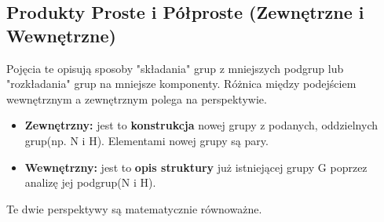 \subsection{Produkty Proste i Półproste (Zewnętrzne i Wewnętrzne)} 
\begin{remark}

	Pojęcia te opisują sposoby "składania" grup z mniejszych podgrup lub "rozkładania" grup na mniejsze komponenty. Różnica między podejściem wewnętrznym a zewnętrznym polega na perspektywie.

\end{remark}
	\begin{itemize}
		\item \textbf{Zewnętrzny:} jest to \textbf{konstrukcja} nowej grupy z podanych, oddzielnych grup(np. N i H). Elementami nowej grupy są pary.
		\item \textbf{Wewnętrzny:} jest to \textbf{opis struktury} już istniejącej grupy G poprzez analizę jej podgrup(N i H).
	\end{itemize}
	Te dwie perspektywy są matematycznie równoważne.

